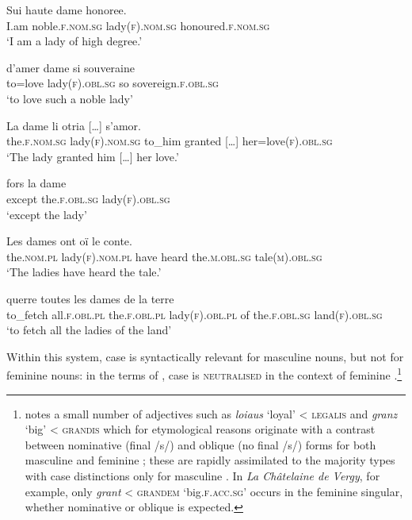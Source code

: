 \documentclass[output=paper,colorlinks,citecolor=brown]{langscibook}
\begin{document}
\begin{exe}
	\ex \label{06ex7}
	\begin{xlist}
		\ex
		\gll Sui haute dame honoree. \\
		I.am noble.\textsc{f.nom.sg} lady\textsc{(f).nom.sg} honoured.\textsc{f.nom.sg} \\
		\trans ‘I am a lady of high degree.’
		
		\ex
		\gll d’amer dame si souveraine \\
		to=love lady\textsc{(f).obl.sg} so sovereign.\textsc{f.obl.sg} \\
		\trans ‘to love such a noble lady’
		
		\ex
		\gll La dame li otria […] s’amor. \\
		the.\textsc{f.nom.sg} lady\textsc{(f).nom.sg} to\_him granted […] her=love\textsc{(f).obl.sg} \\
		\trans ‘The lady granted him […] her love.’
		
		\ex
		\gll fors la dame \\
		except the.\textsc{f.obl.sg} lady\textsc{(f).obl.sg} \\
		\trans ‘except the lady’
		
		\ex
		\gll Les dames ont oï le conte. \\
		the.\textsc{nom.pl} lady\textsc{(f).nom.pl} have heard the.\textsc{m.obl.sg} tale\textsc{(m).obl.sg} \\
		\trans ‘The ladies have heard the tale.’
		
		\ex
		\gll querre toutes les dames de la terre \\
		to\_fetch all.\textsc{f.obl.pl} the.\textsc{f.obl.pl} lady\textsc{(f).obl.pl} of the.\textsc{f.obl.sg} land\textsc{(f).obl.sg} \\
		\trans ‘to fetch all the ladies of the land’
	\end{xlist}
\end{exe}

Within this system, case is syntactically relevant for masculine nouns, but not for feminine nouns: in the terms of \citet[28--30]{baermanbrowncorbett2005}, case is \textsc{neutralised} in the context of feminine .\footnote{\citet{buridant2019} notes a small number of adjectives such as \emph{loiaus} `loyal' \textless{} \textsc{legalis} and \emph{granz} `big' \textless{} \textsc{grandis} which for etymological reasons originate with a contrast between nominative (final /s/) and oblique (no final /s/) forms for both masculine and feminine ; these are rapidly assimilated to the majority types with case distinctions only for masculine . In \emph{La Châtelaine de Vergy}, for example, only \emph{grant} \textless{} \textsc{grandem} `big.\textsc{f.acc.sg}' occurs in the feminine singular, whether nominative or oblique is expected.}
\end{document}
